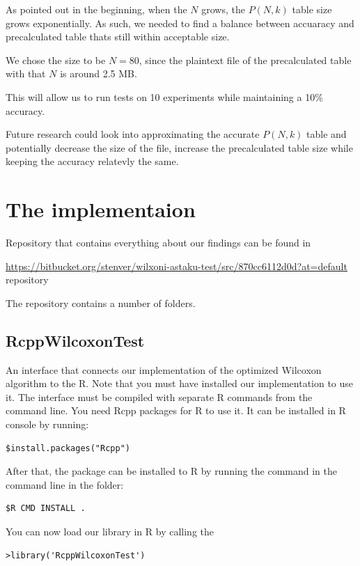 \documentclass[12pt]{article}
\begin{document}
As pointed out in the beginning, when the $N$ grows, the $P(N, k)$ table size grows exponentially. As such, we needed to find a balance between accuaracy and precalculated table thats still within acceptable size.

We chose the size to be $N=80$, since the plaintext file of the precalculated table with that $N$ is around 2.5 MB.

This will allow us to run tests on 10 experiments while maintaining a 10\% accuracy.

Future research could look into approximating the accurate $P(N, k)$ table and potentially decrease the size of the file, increase the precalculated table size while keeping the accuracy relatevly the same.

\newpage

\section{The implementaion}
Repository that contains everything about our findings can be found in

\url{https://bitbucket.org/stenver/wilxoni-astaku-test/src/870cc6112d0d?at=default} repository

The repository contains a number of folders.

\subsection{RcppWilcoxonTest}
 An interface that connects our implementation of the optimized Wilcoxon algorithm to the R. Note that you must have installed our implementation to use it. The interface must be compiled with separate R commands from the command line. You need Rcpp packages for R to use it. It can be installed in R console by running:

\begin{lstlisting}
$install.packages("Rcpp")
\end{lstlisting}

After that, the package can be installed to R by running the command in the command line in the folder:

\begin{lstlisting}
$R CMD INSTALL .
\end{lstlisting}

You can now load our library in R by calling the

\begin{lstlisting}
>library('RcppWilcoxonTest')
\end{lstlisting}
\end{document}
